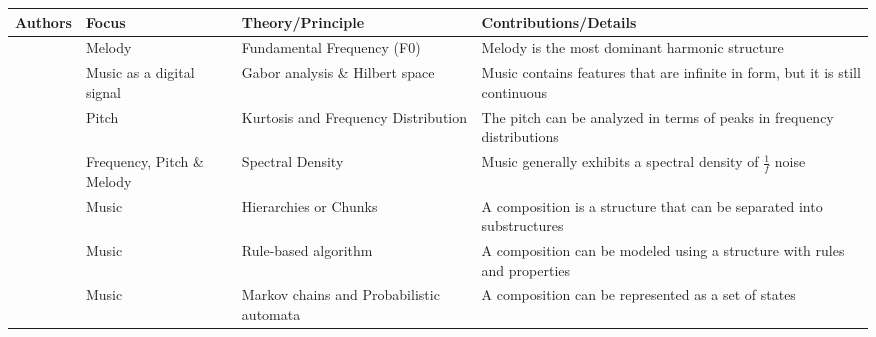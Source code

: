 \begin{landscape} %
\begin{table} [!htbp]  

         \label{tab:rsotmaomaim} 
   \vspace{0.20cm}    
        \begin{tabular}{|p{5cm}|p{3cm}|p{3cm}|p{5cm}|} %
        \hline 

       Authors & Focus & Theory/Principle & Contributions/Details \\ \hline
       
       \citet{goto2004real, salamon2012melody, poliner2007melody} & Melody & Fundamental Frequency (F0) & Melody is the most dominant harmonic structure \\ \hline
       
       \citet{dorfler2001time} & Music as a digital signal & Gabor analysis \& Hilbert space & Music contains features that are infinite in form, but it is still continuous \\ \hline
       
       \citet{fucks1962mathematical} & Pitch & Kurtosis and Frequency Distribution & The pitch can be analyzed in terms of peaks in frequency distributions \\ \hline
       
       \citet{voss1978noise, nettheim1992on, gunduz2005mathematical} & Frequency, Pitch \& Melody & Spectral Density & Music generally exhibits a spectral density of $\frac{1}{f}$ noise \\ \hline
       
       \citet{buxton1978the, brinkman1984data} & Music & Hierarchies or Chunks & A composition is a structure that can be separated into substructures \\ \hline
       
       \citet{bozhanov2014computoser} & Music & Rule-based algorithm & A composition can be modeled using a structure with rules and properties \\ \hline
       
       \citet{schulze2011music} & Music & Markov chains and Probabilistic automata & A composition can be represented as a set of states \\ \hline
       
        \end{tabular}
\end{table}
\end{landscape}


